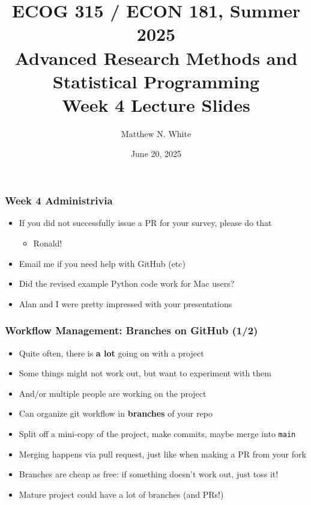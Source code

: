 \documentclass[aspectratio=169]{beamer}
\author{Matthew N. White}
\title[add]{ECOG 315 / ECON 181, Summer 2025 \\ Advanced Research Methods and Statistical Programming \\ Week 4 Lecture Slides}
\institute[HU]{Howard University}
\date{June 20, 2025}
\begin{document}
\begin{frame}
\maketitle
\end{frame}


\begin{frame}
\frametitle{Week 4 Administrivia}
	
\begin{itemize}
\item If you did not successfully issue a PR for your survey, please do that
\begin{itemize}
	\item Ronald!
\end{itemize}

\item Email me if you need help with GitHub (etc)

\item Did the revised example Python code work for Mac users?

\item Alan and I were pretty impressed with your presentations
\end{itemize}
	
\end{frame}


\begin{frame}
\frametitle{Workflow Management: Branches on GitHub (1/2)}
\begin{itemize}
	\item Quite often, there is \textbf{a lot} going on with a project
	
	\item Some things might not work out, but want to experiment with them
	
	\item And/or multiple people are working on the project
	
	\item <2->Can organize git workflow in \textbf{branches} of your repo
	
	\item <2->Split off a mini-copy of the project, make commits, maybe merge into \texttt{main}
	
	\item <3->Merging happens via pull request, just like when making a PR from your fork
	
	\item <3->Branches are cheap as free: if something doesn't work out, just toss it!
	
	\item <4->Mature project could have a lot of branches (and PRs!)
\end{itemize}

\end{frame}
\end{document}
